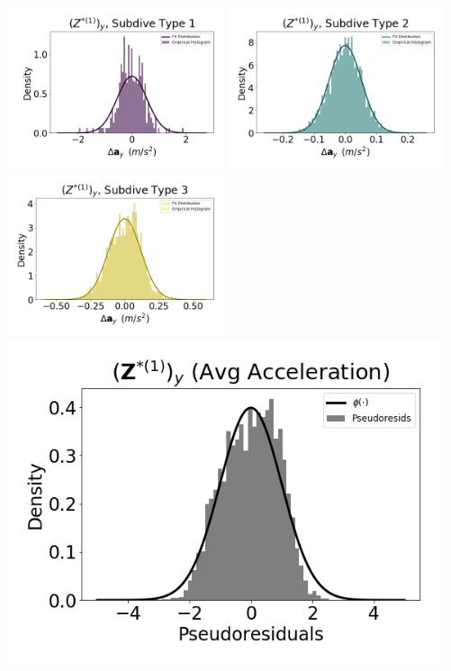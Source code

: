 \documentclass[12pt]{TD-CJS}
\begin{document}
\newpage

\includegraphics[width=2.5in]{../Plots/CarHHMM1_empirical_hist_Ay_0.png}
\includegraphics[width=2.5in]{../Plots/CarHHMM1_empirical_hist_Ay_1.png}
\includegraphics[width=2.5in]{../Plots/CarHHMM1_empirical_hist_Ay_2.png}
\includegraphics[width=5in]{../Plots/CarHHMM1_psedoresids_Ay.png}
\end{document}
